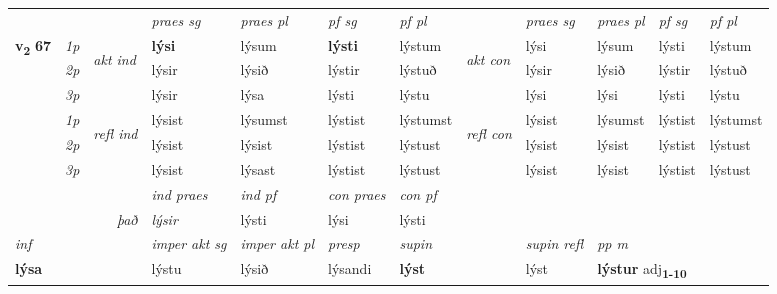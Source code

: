 \begin{longtable}[l]{X>{\footnotesize\itshape}llXXXXlXXXX}
 & &   & \textit{praes sg}  & \textit{praes pl}    & \textit{ pf sg} & \textit{pf pl} & & \textit{praes sg}  & \textit{praes pl}    & \textit{pf sg} & \textit{pf pl }  \\ \cmidrule{4-7} \cmidrule{9-12}
 \multirow{2}{*}{{{\textbf{v{\textsubscript{2}}} \Large{\textbf{67}}}}}  & 1p & \multirow{3}{*}{\begin{turn}{90}\textit{akt ind}\end{turn}} & \textbf{lýsi} & lýsum & \textbf{lýsti} & lýstum & \multirow{3}{*}{\begin{turn}{90}\textit{akt con}\end{turn}} &lýsi & lýsum & lýsti & lýstum\\*
 & 2p &  &  lýsir  & lýsið & lýstir & lýstuð & & lýsir & lýsið & lýstir & lýstuð \\*
 & 3p &  & lýsir & lýsa & lýsti & lýstu & & lýsi & lýsi& lýsti & lýstu \\*
\cmidrule{4-7} \cmidrule{9-12}
 & 1p & \multirow{3}{*}{\begin{turn}{90}\textit{refl ind}\end{turn}}  & lýsist & lýsumst & lýstist & lýstumst & \multirow{3}{*}{\begin{turn}{90}\textit{refl con}\end{turn}}  &lýsist & lýsumst & lýstist & lýstumst \\*
 & 2p &  & lýsist & lýsist & lýstist & lýstust & &lýsist & lýsist & lýstist & lýstust \\*
 & 3p  & & lýsist & lýsast & lýstist & lýstust & & lýsist & lýsist& lýstist & lýstust \\*
\cmidrule{4-7} \cmidrule{9-12}

   && &  \textit{ind praes} & \textit{ind pf} & \textit{con praes} & \textit{con pf} \\*
\multicolumn{3}{r}{\textit{það}} & lýsir & lýsti & lýsi & lýsti \\*

\cmidrule{4-7}
   {\textit{inf}} & &  & \textit{imper akt sg} & \textit{imper akt pl}   & \textit{presp} & \textit{supin} && \textit{supin refl} & \textit{pp m} \\*
  {\textbf{lýsa}} & && lýstu  & lýsið   & lýsandi &  \textbf{lýst} && lýst & \multicolumn{2}{l}{\textbf{lýstur} adj\textbf{\textsubscript{1-10}}} \\*


\end{longtable}
